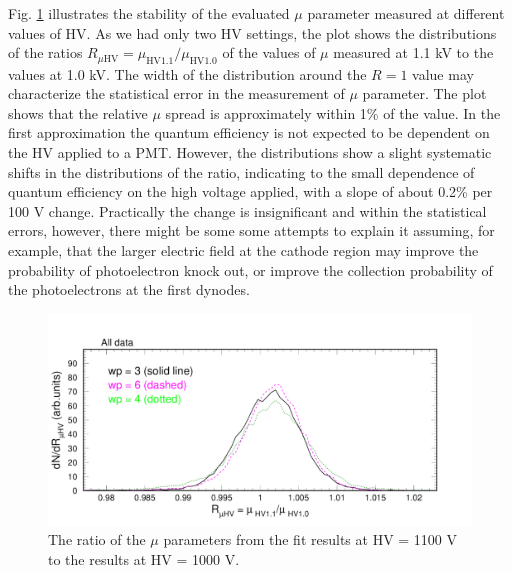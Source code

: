 Fig. \ref{fig:pglobal_mHV} illustrates the stability of the evaluated $\mu$ parameter measured at different values of HV. As we had only two HV settings, the plot shows the distributions of the ratios $R_{\mu\mathrm{HV}} = \mu_{\mathrm{HV1.1}}/\mu_{\mathrm{HV1.0}}$ of the values of $\mu$ measured at 1.1 kV to the values at 1.0 kV. The width of the distribution around the $R = 1$ value may characterize the statistical error in the measurement of $\mu$ parameter. The plot shows that the relative $\mu$ spread is approximately within 1\% of the value. In the first approximation the quantum efficiency is not expected to be dependent on the HV applied to a PMT. However, the distributions show a slight systematic shifts in the distributions of the ratio, indicating to the small dependence of quantum efficiency on the high voltage applied, with a slope of about 0.2\% per 100 V change. Practically the change is insignificant and within the statistical errors, however, there might be some some attempts to explain it assuming, for example, that the larger electric field at the cathode region may improve the probability of photoelectron knock out, or improve the collection probability of the photoelectrons at the first dynodes.
\begin{figure}[hbt]
	\centering
	\includegraphics[width=0.98\linewidth, trim=0 15 50 35, clip]{figures/pglobal_mHV.pdf}
	\caption{The ratio of the $\mu$ parameters from the fit results at HV = 1100 V to the results at HV = 1000 V.}
	\label{fig:pglobal_mHV}
\end{figure}

